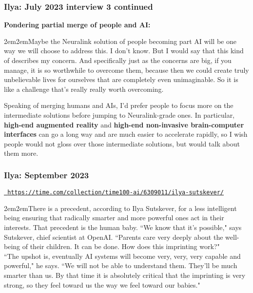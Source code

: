\documentclass{beamer}
\newenvironment{customquote}
  {\begin{adjustwidth}{2em}{2em}\noindent\textnormal}
  {\end{adjustwidth}}
\newcommand{\msblue}[1]{{\color{myblue} #1}}
\begin{document}
\begin{frame}

  \frametitle{Ilya: July 2023 interview 3 continued}

{\bf Pondering partial merge of people and AI:}\\[2ex]

\begin{customquote}
Maybe the Neuralink solution of people becoming part AI will be one way we will choose to address this. I don't know. But I would say that this kind of describes my concern. And specifically just as the concerns are big, if you manage, it is so worthwhile to overcome them, because then we could create truly unbelievable lives for ourselves that are completely even unimaginable. So it is like a challenge that's really really worth overcoming.\\[2ex]
\end{customquote}

{\footnotesize Speaking of merging humans and AIs, I'd prefer people to focus more on the intermediate solutions before jumping to Neuralink-grade ones. In particular, {\bf high-end augmented reality} and {\bf high-end non-invasive brain-computer interfaces} can go a long way and are much easier to accelerate rapidly, so I wish people would not gloss over those intermediate solutions, but would talk about them more.}

\end{frame}

\begin{frame}

  \frametitle{Ilya: September 2023}

\href{https://time.com/collection/time100-ai/6309011/ilya-sutskever/}{\tt\small \msblue{https://time.com/collection/time100-ai/6309011/ilya-sutskever/}}\\[2ex]

\begin{customquote}
There is a precedent, according to Ilya Sutskever, for a less intelligent being ensuring that radically smarter and more powerful ones act in their interests. That precedent is the human baby. ``We know that it’s possible," says Sutskever, chief scientist at OpenAI. ``Parents care very deeply about the well-being of their children. It can be done. How does this imprinting work?"\\[2ex]

``The upshot is, eventually AI systems will become very, very, very capable and powerful," he says. ``We will not be able to understand them. They’ll be much smarter than us. By that time it is absolutely critical that the imprinting is very strong, so they feel toward us the way we feel toward our babies."
\end{customquote}

\end{frame}
\end{document}
